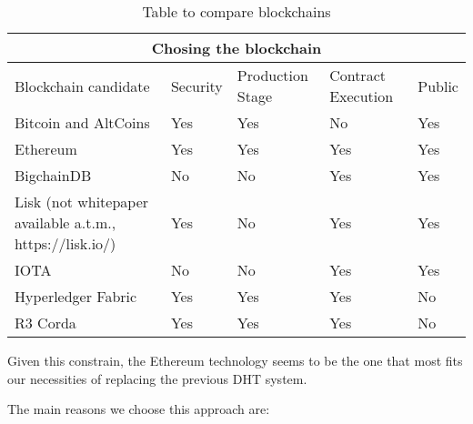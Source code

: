 \begin{table}[h!]
\centering
\begin{tabular}{ |p{7cm}|p{2cm}|p{2cm}|p{2cm}|p{2cm}|  }
\hline
\multicolumn{5}{|c|}{Chosing the blockchain} \\
\hline
Blockchain candidate & Security & Production Stage & Contract Execution & Public \\
\hline
Bitcoin and AltCoins \cite{Nakamoto_bitcoin:a} & Yes & Yes & No\cite{Bitcoin_notTuringComplete} & Yes \\
\hline
Ethereum \cite{ethereum_whitepaper} & Yes & Yes & Yes & Yes \\
\hline
BigchainDB \cite{bigchaindb_whitepaper} & No \cite{_bigchaindb_bullshit} \ & No & Yes & Yes \\
\hline
Lisk (not whitepaper available a.t.m., https://lisk.io/)& Yes & No \cite{lisk_problems} & Yes & Yes \\
\hline
IOTA \cite{iota_whitepaper}& No \cite{iota_problems} & No & Yes & Yes \\
\hline
Hyperledger Fabric \cite{martindale_fabric:_2017}& Yes & Yes & Yes & No \\
\hline
R3 Corda \cite{corda_whitepaper}& Yes & Yes & Yes & No \\
\hline
\end{tabular}
\caption{Table to compare blockchains}
\label{table:1}
\end{table}



Given this constrain, the Ethereum technology seems to be the one that most fits our necessities of replacing the previous DHT system.



The main reasons we choose this approach are:

